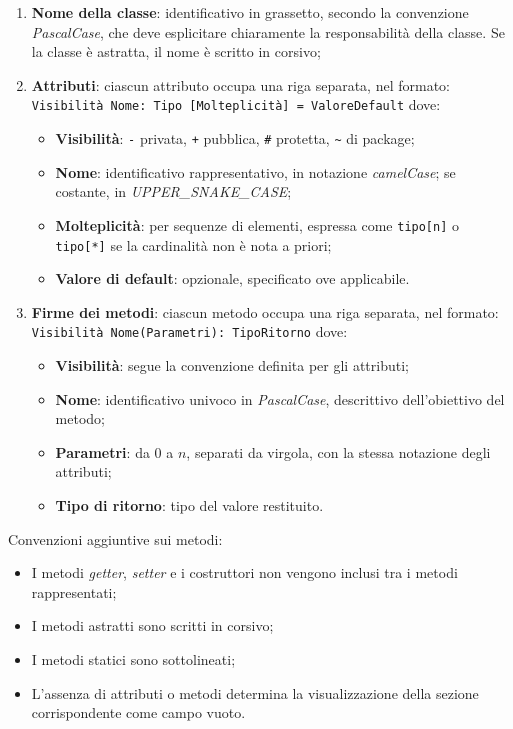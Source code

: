 \documentclass[a4paper, 10pt]{article}
\begin{document}
\begin{enumerate}
    \item \textbf{Nome della classe}: identificativo in grassetto, secondo la convenzione \textit{PascalCase}, che deve esplicitare chiaramente la responsabilità della classe. Se la classe è astratta, il nome è scritto in corsivo;
    \item \textbf{Attributi}: ciascun attributo occupa una riga separata, nel formato:
    \noindent\texttt{Visibilità Nome: Tipo [Molteplicità] = ValoreDefault}
    dove:
    \begin{itemize}
        \item \textbf{Visibilità}: \texttt{-} privata, \texttt{+} pubblica, \texttt{\#} protetta, \texttt{\textasciitilde} di package;
        \item \textbf{Nome}: identificativo rappresentativo, in notazione \textit{camelCase}; se costante, in \textit{UPPER\_SNAKE\_CASE};
        \item \textbf{Molteplicità}: per sequenze di elementi, espressa come \texttt{tipo[n]} o \texttt{tipo[*]} se la cardinalità non è nota a priori;
        \item \textbf{Valore di default}: opzionale, specificato ove applicabile.
    \end{itemize}
    \item \textbf{Firme dei metodi}: ciascun metodo occupa una riga separata, nel formato:
    \noindent\texttt{Visibilità Nome(Parametri): TipoRitorno}
    dove:
    \begin{itemize}
        \item \textbf{Visibilità}: segue la convenzione definita per gli attributi;
        \item \textbf{Nome}: identificativo univoco in \textit{PascalCase}, descrittivo dell'obiettivo del metodo;
        \item \textbf{Parametri}: da 0 a $n$, separati da virgola, con la stessa notazione degli attributi;
        \item \textbf{Tipo di ritorno}: tipo del valore restituito.
    \end{itemize}
\end{enumerate}

Convenzioni aggiuntive sui metodi:
\begin{itemize}
    \item I metodi \textit{getter}, \textit{setter} e i costruttori non vengono inclusi tra i metodi rappresentati;
    \item I metodi astratti sono scritti in corsivo;
    \item I metodi statici sono sottolineati;
    \item L'assenza di attributi o metodi determina la visualizzazione della sezione corrispondente come campo vuoto.
\end{itemize}
\end{document}
